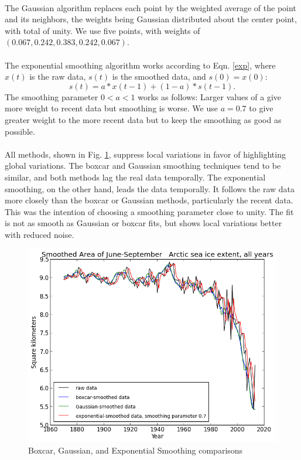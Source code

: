 \documentclass[12pt,a4paper]{article} %
\begin{document}
\paragraph{}
The Gaussian algorithm replaces each point by the weighted average of the point and its neighbors, the weights being Gaussian distributed about the center point, with total of unity.  We use five points, with weights of $(0.067, 0.242, 0.383, 0.242, 0.067)$.
\paragraph{}
The exponential smoothing algorithm works according to Eqn. \ref{exp}, where $x(t)$ is the raw data,  $s(t)$ is the smoothed data, and $s(0) = x(0)$:
\begin{equation}
s(t) = a*x(t-1) + (1-a)*s(t-1).
\label{exp}
\end{equation}
The smoothing parameter $0<a<1$ works as follows:  Larger values of a give more weight to recent data but smoothing is worse. We use $a = 0.7$ to give greater weight to the more recent data but to keep the smoothing as good as possible.

\paragraph{}
All methods, shown in Fig. \ref{smoothed}, suppress local variations in favor of highlighting global variations. The boxcar and Gaussian smoothing techniques tend to be similar, and both methods lag the real data temporally. The exponential smoothing, on the other hand, leads the data temporally. It follows the raw data more closely than the boxcar or Gaussian methods, particularly the recent data. This was the intention of choosing a smoothing parameter close to unity. The fit is not as smooth as Gaussian or boxcar fits, but shows local variations better with reduced noise.

\begin{figure}[hp]
\centering
 \includegraphics[width=0.75\linewidth]{../output/smooth_avg_area_annual.png}
\caption{Boxcar, Gaussian, and Exponential Smoothing comparisons}
\label{smoothed}
\end{figure}
\end{document}
